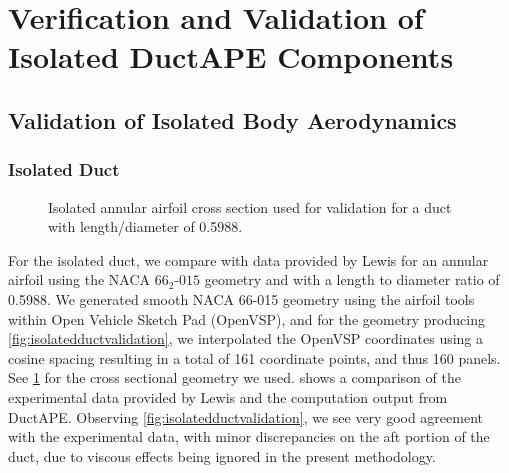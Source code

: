 
\section{Verification and Validation of Isolated DuctAPE Components}

\subsection{Validation of Isolated Body Aerodynamics}

\subsubsection{Isolated Duct}

\begin{figure}[h!]
    \centering
        
        \caption{Isolated annular airfoil cross section used for validation for a duct with length/diameter of 0.5988.}
    \label{fig:ductgeom}
\end{figure}

For the isolated duct, we compare with data provided by Lewis for an annular airfoil using the NACA \(66_2\)-\(015\) geometry and with a length to diameter ratio of 0.5988.
%
We generated smooth NACA 66-015 geometry using the airfoil tools within Open Vehicle Sketch Pad (OpenVSP), and for the geometry producing \cref{fig:isolatedductvalidation}, we interpolated the OpenVSP coordinates using a cosine spacing resulting in a total of 161 coordinate points, and thus 160 panels.
%
See \cref{fig:ductgeom} for the cross sectional geometry we used.
%
 shows a comparison of the experimental data provided by Lewis and the computation output from DuctAPE.
%
Observing \cref{fig:isolatedductvalidation}, we see very good agreement with the experimental data, with minor discrepancies on the aft portion of the duct, due to viscous effects being ignored in the present methodology.

